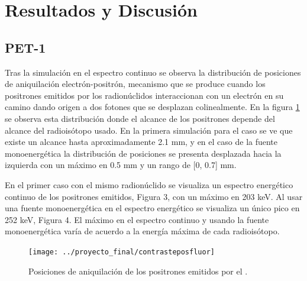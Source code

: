 \documentclass[12pt,a4paper,onecolumn]{article}
\begin{document}
\section{Resultados y Discusión}
\subsection*{PET-1}
Tras la simulación en el espectro continuo se observa la distribución de posiciones de aniquilación electrón-positrón, mecanismo que se produce cuando los positrones emitidos por los radionúclidos interaccionan con un electrón en su camino dando origen a dos fotones que se desplazan colinealmente. En la figura \ref{fig:contrasteposfluor} se observa esta distribución donde el alcance de los positrones depende del alcance del radioisótopo usado. En la primera simulación para el caso   se ve que existe un alcance hasta aproximadamente 2.1 mm, y en el caso de la fuente monoenergética la distribución de posiciones se presenta desplazada hacia la izquierda con un máximo en 0.5 mm y un rango de [0, 0.7] mm.

En el primer caso con el mismo radionúclido se visualiza un espectro energético continuo de los positrones emitidos, Figura 3, con un máximo en 203 keV. Al usar una fuente monoenergética en el espectro energético se visualiza un único pico en 252 keV, Figura 4. El máximo en el espectro continuo y usando la fuente monoenergética varía de acuerdo a la energía máxima de cada radioisótopo.
\begin{figure}[H]
	\centering
	\texttt{[image: ../proyecto\_final/contrasteposfluor]}
	\caption{Posiciones de aniquilación de los positrones emitidos por el .}
	\label{fig:contrasteposfluor}
\end{figure}
\end{document}
